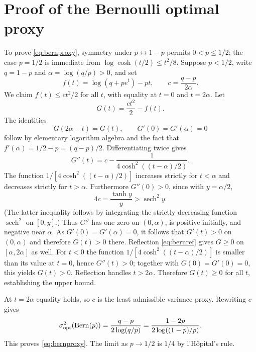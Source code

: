 \documentclass[11pt,a4paper]{article}
\begin{document}
\section{Proof of the Bernoulli optimal proxy}\label{app:bernoulli}
To prove \eqref{eq:bernproxy}, symmetry under $p\leftrightarrow1-p$ permits $0<p\le1/2$; the case $p=1/2$ is immediate from $\log\cosh(t/2)\le t^2/8$. Suppose $p<1/2$, write $q=1-p$ and $\alpha=\log(q/p)>0$, and set
\[
 f(t)=\log(q+pe^t)-pt,\qquad
 c=\frac{q-p}{2\alpha}.
\]
We claim $f(t)\le ct^2/2$ for all $t$, with equality at $t=0$ and $t=2\alpha$. Let
\[
 G(t)=\frac{ct^2}{2}-f(t).
\]
The identities
\begin{equation}\label{eq:bernref}
 G(2\alpha-t)=G(t),\qquad
 G'(0)=G'(\alpha)=0
\end{equation}
follow by elementary logarithm algebra and the fact that $f'(\alpha)=1/2-p=(q-p)/2$. Differentiating twice gives
\begin{equation}\label{eq:bernsecond}
 G''(t)=c-\frac1{4\cosh^2((t-\alpha)/2)}.
\end{equation}
The function $1/[4\cosh^2((t-\alpha)/2)]$ increases strictly for $t<\alpha$ and decreases strictly for $t>\alpha$. Furthermore $G''(0)>0$, since with $y=\alpha/2$,
\[
 4c=\frac{\tanh y}{y}>\operatorname{sech}^2 y.
\]
(The latter inequality follows by integrating the strictly decreasing function $\operatorname{sech}^2$ on $[0,y]$.) Thus $G''$ has one zero on $(0,\alpha)$, is positive initially, and negative near $\alpha$. As $G'(0)=G'(\alpha)=0$, it follows that $G'(t)>0$ on $(0,\alpha)$ and therefore $G(t)>0$ there. Reflection \eqref{eq:bernref} gives $G\ge0$ on $[\alpha,2\alpha]$ as well. For $t<0$ the function $1/[4\cosh^2((t-\alpha)/2)]$ is smaller than its value at $t=0$, hence $G''(t)>0$; together with $G(0)=G'(0)=0$, this yields $G(t)>0$. Reflection handles $t>2\alpha$. Therefore $G(t)\ge0$ for all $t$, establishing the upper bound.

At $t=2\alpha$ equality holds, so $c$ is the least admissible variance proxy. Rewriting $c$ gives
\[
 \sigma^2_{\mathrm{opt}}(\operatorname{Bern}(p))
 =\frac{q-p}{2\log(q/p)}=
 \frac{1-2p}{2\log((1-p)/p)}.
\]
This proves \eqref{eq:bernproxy}. The limit as $p\to1/2$ is $1/4$ by l'H\^opital's rule.




\end{document}
